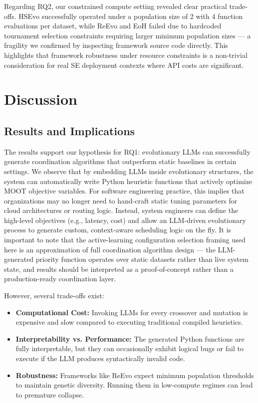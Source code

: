 \documentclass[sigconf,nonacm]{acmart}
\begin{document}
Regarding RQ2, our constrained compute setting revealed clear practical trade-offs. HSEvo successfully operated under a population size of 2 with 4 function evaluations per dataset, while ReEvo and EoH failed due to hardcoded tournament selection constraints requiring larger minimum population sizes --- a fragility we confirmed by inspecting framework source code directly. This highlights that framework robustness under resource constraints is a non-trivial consideration for real SE deployment contexts where API costs are significant.

\section{Discussion}

\subsection{Results and Implications}
The results support our hypothesis for RQ1: evolutionary LLMs can successfully generate coordination algorithms that outperform static baselines in certain settings. We observe that by embedding LLMs inside evolutionary structures, the system can automatically write Python heuristic functions that actively optimize MOOT objective variables. For software engineering practice, this implies that organizations may no longer need to hand-craft static tuning parameters for cloud architectures or routing logic. Instead, system engineers can define the high-level objectives (e.g., latency, cost) and allow an LLM-driven evolutionary process to generate custom, context-aware scheduling logic on the fly. It is important to note that the active-learning configuration selection framing used here is an approximation of full coordination algorithm design --- the LLM-generated priority function operates over static datasets rather than live system state, and results should be interpreted as a proof-of-concept rather than a production-ready coordination layer.

However, several trade-offs exist:
\begin{itemize}
\item \textbf{Computational Cost:} Invoking LLMs for every crossover and mutation is expensive and slow compared to executing traditional compiled heuristics.
\item \textbf{Interpretability vs. Performance:} The generated Python functions are fully interpretable, but they can occasionally exhibit logical bugs or fail to execute if the LLM produces syntactically invalid code.
\item \textbf{Robustness:} Frameworks like ReEvo expect minimum population thresholds to maintain genetic diversity. Running them in low-compute regimes can lead to premature collapse.
\end{itemize}
\end{document}

